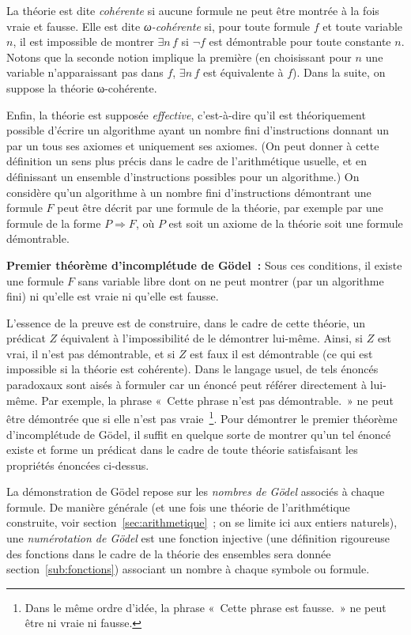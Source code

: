 La théorie est dite \emph{cohérente} si aucune formule ne peut être montrée à la fois vraie et fausse. 
Elle est dite \emph{ω-cohérente} si, pour toute formule $f$ et toute variable $n$, il est impossible de montrer $\exists n \, f$ si $\neg f$ est démontrable pour toute constante $n$. 
Notons que la seconde notion implique la première (en choisissant pour $n$ une variable n'apparaissant pas dans $f$, $\exists n \, f$ est équivalente à $f$).
Dans la suite, on suppose la théorie ω-cohérente.

Enfin, la théorie est supposée \textit{effective}, c'est-à-dire qu'il est théoriquement possible d'écrire un algorithme ayant un nombre fini d'instructions donnant un par un tous ses axiomes et uniquement ses axiomes. 
(On peut donner à cette définition un sens plus précis dans le cadre de l'arithmétique usuelle, et en définissant un ensemble d'instructions possibles pour un algorithme.) 
On considère qu'un algorithme à un nombre fini d'instructions démontrant une formule $F$ peut être décrit par une formule de la théorie, par exemple par une formule de la forme $P \Rightarrow F$, où $P$ est soit un axiome de la théorie soit une formule démontrable.

\medskip

\noindent \textbf{Premier théorème d'incomplétude de Gödel :} Sous ces conditions, il existe une formule $F$ sans variable libre dont on ne peut montrer (par un algorithme fini) ni qu'elle est vraie ni qu'elle est fausse.

\medskip

L'essence de la preuve est de construire, dans le cadre de cette théorie, un prédicat $Z$ équivalent à l'impossibilité de le démontrer lui-même. 
Ainsi, si $Z$ est vrai, il n'est pas démontrable, et si $Z$ est faux il est démontrable (ce qui est impossible si la théorie est cohérente). 
Dans le langage usuel, de tels énoncés paradoxaux sont aisés à formuler car un énoncé peut référer directement à lui-même. 
Par exemple, la phrase « Cette phrase n'est pas démontrable. » ne peut être démontrée que si elle n'est pas vraie~\footnote{ Dans le même ordre d'idée, la phrase « Cette phrase est fausse. » ne peut être ni vraie ni fausse.}.
Pour démontrer le premier théorème d'incomplétude de Gödel, il suffit en quelque sorte de montrer qu'un tel énoncé existe et forme un prédicat dans le cadre de toute théorie satisfaisant les propriétés énoncées ci-dessus.

La démonstration de Gödel repose sur les \textit{nombres de Gödel} associés à chaque formule. 
De manière générale (et une fois une théorie de l'arithmétique construite, voir section~\ref{sec:arithmetique} ; on se limite ici aux entiers naturels), une \textit{numérotation de Gödel} est une fonction injective (une définition rigoureuse des fonctions dans le cadre de la théorie des ensembles sera donnée section~\ref{sub:fonctions}) associant un nombre à chaque symbole ou formule. 

